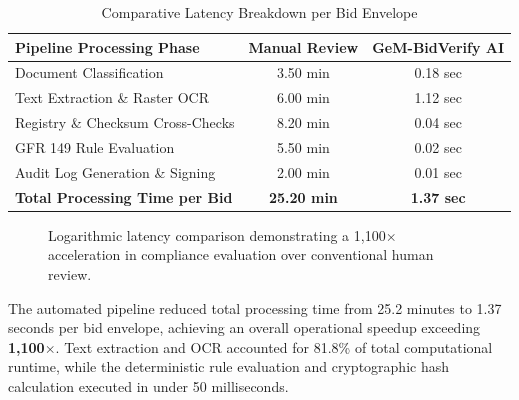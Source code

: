 \documentclass[conference]{IEEEtran}
\begin{document}
\begin{table}[!ht]
\centering
\caption{Comparative Latency Breakdown per Bid Envelope}
\label{tab:latency}
\begin{tabularx}{\columnwidth}{Xcc}
\toprule
\textbf{Pipeline Processing Phase} & \textbf{Manual Review} & \textbf{GeM-BidVerify AI} \\
\midrule
Document Classification & 3.50 min & 0.18 sec \\
Text Extraction \& Raster OCR & 6.00 min & 1.12 sec \\
Registry \& Checksum Cross-Checks & 8.20 min & 0.04 sec \\
GFR 149 Rule Evaluation & 5.50 min & 0.02 sec \\
Audit Log Generation \& Signing & 2.00 min & 0.01 sec \\
\midrule
\textbf{Total Processing Time per Bid} & \textbf{25.20 min} & \textbf{1.37 sec} \\
\bottomrule
\end{tabularx}
\end{table}

\begin{figure}[!ht]
\centering
{}
\caption{Logarithmic latency comparison demonstrating a 1,100$\times$ acceleration in compliance evaluation over conventional human review.}
\label{fig:latency}
\end{figure}

The automated pipeline reduced total processing time from 25.2 minutes to 1.37 seconds per bid envelope, achieving an overall operational speedup exceeding \textbf{1,100$\times$}. Text extraction and OCR accounted for 81.8\% of total computational runtime, while the deterministic rule evaluation and cryptographic hash calculation executed in under 50 milliseconds.
\end{document}
